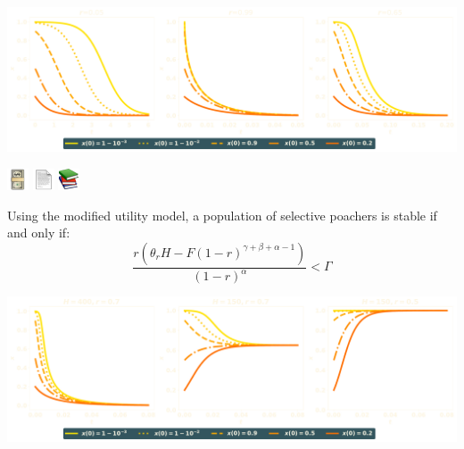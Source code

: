 \documentclass{beamer}
\begin{document}
\begin{frame}
    \centering
    \includegraphics[width=\textwidth]{static/numeric_one.pdf}
\end{frame}

\begin{frame}
    \centering
    \includegraphics[width=.15\textwidth]{static/1F4B5c.pdf} \hspace{1cm}
    \includegraphics[width=.15\textwidth]{static/1F4C4.pdf} \hspace{1cm}
    \includegraphics[width=.15\textwidth]{static/1F4DA.pdf}
\end{frame}

\begin{frame}
    \centering
    \footnotesize
    \begin{theorem}[Disincentive]
    Using the modified utility model, a population of selective poachers is stable
    if and only if:
     \[\frac{r(\theta_r H - F (1 - r)^{\gamma + \beta + \alpha -1})}{(1 - r)^{\alpha}} < \Gamma\]
    \end{theorem}

    \pause
    \vspace{1cm}
    \centering
    \includegraphics[width=\textwidth]{static/numeric_two.pdf}
\end{frame}
\end{document}
